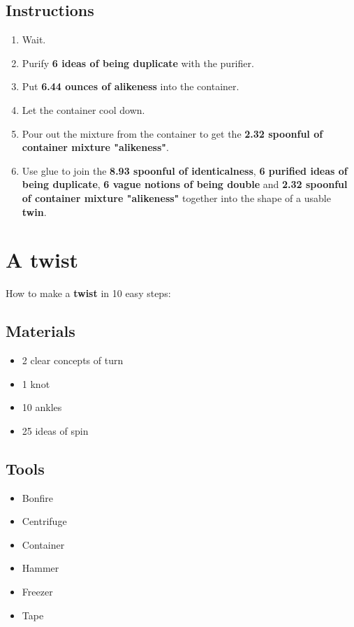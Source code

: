 \documentclass{article}
\begin{document}
\subsection{Instructions}\begin{enumerate}
\item 
Wait.
\item 
Purify \textbf{6 ideas of being duplicate} with the purifier.
\item 
Put \textbf{6.44 ounces of alikeness} into the container.
\item 
Let the container cool down.
\item 
Pour out the mixture from the container to get the \textbf{2.32 spoonful of container mixture "alikeness"}.
\item 
Use glue to join the \textbf{8.93 spoonful of identicalness}, \textbf{6 purified ideas of being duplicate}, \textbf{6 vague notions of being double} and \textbf{2.32 spoonful of container mixture "alikeness"} together into the shape of a usable \textbf{twin}.
\end{enumerate}
\newpage
\section{A twist}How to make a \textbf{twist} in 10 easy steps:

\subsection{Materials}\begin{itemize}
\item 
2 clear concepts of turn
\item 
1 knot
\item 
10 ankles
\item 
25 ideas of spin
\end{itemize}
\subsection{Tools}\begin{itemize}
\item 
Bonfire
\item 
Centrifuge
\item 
Container
\item 
Hammer
\item 
Freezer
\item 
Tape
\end{itemize}
\end{document}
